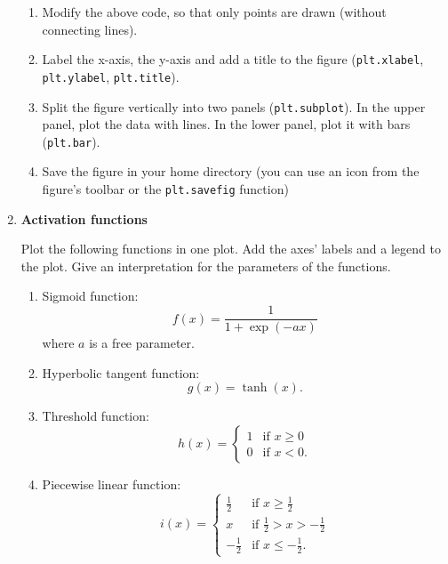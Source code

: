 \documentclass[12pt, a4]{article}
\begin{document}
\begin{enumerate}
    \begin{enumerate}
        \item Modify the above code, so that only points are drawn (without connecting lines).
        \item Label the x-axis, the y-axis and add a title to the figure (\texttt{plt.xlabel}, \texttt{plt.ylabel}, \texttt{plt.title}).
        \item Split the figure vertically into two panels (\texttt{plt.subplot}). In the upper panel, plot the data with lines. In the lower panel, plot it with bars (\texttt{plt.bar}).
        \item Save the figure in your home directory (you can use an icon from the figure's toolbar or the \texttt{plt.savefig} function)
    \end{enumerate}

    \item \textbf{Activation functions}
    \label{ex:activation}

        Plot the following functions in one plot. Add the axes' labels and a legend to the plot. Give an interpretation for the parameters of the functions.
    
        \begin{enumerate}
            \item Sigmoid function:
                $$f(x)=\frac{1}{1+\exp(-ax)}$$
                where $a$ is a free parameter.
            \item Hyperbolic tangent function:
                $$g(x)=\tanh(x).$$
            \item Threshold function:
                \begin{equation*}
                    h(x)=\begin{cases}1 & \text{if $x\geq0$} \\
                                    0 & \text{if $x<0$.}
                        \end{cases}
                \end{equation*}
            \item Piecewise linear function:
                \begin{equation*}
                    i(x)=\begin{cases} \frac{1}{2}& \text{if $x\geq\frac{1}{2}$} \\
                        x & \text{if $\frac{1}{2}>x>-\frac{1}{2}$} \\
                        -\frac{1}{2} & \text{if $x\leq-\frac{1}{2}$.}
                        \end{cases}
                \end{equation*}
    

\end{enumerate}
\end{enumerate}
\end{document}
